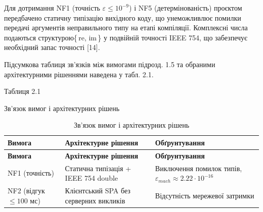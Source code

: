\documentclass[
]{article}
\begin{document}
Для дотримання NF1 (точність \(\varepsilon \leq 10^{- 9}\)) і NF5
(детермінованість) проєктом передбачено статичну типізацію вихідного
коду, що унеможливлює помилки передачі аргументів неправильного типу на
етапі компіляції. Комплексні числа подаються структурою\{ re, im \} у
подвійній точності IEEE 754, що забезпечує необхідний запас точності
{[}14{]}.

Підсумкова таблиця зв'язків між вимогами підрозд. 1.5 та обраними
архітектурними рішеннями наведена у табл. 2.1.

Таблиця 2.1

Зв'язок вимог і архітектурних рішень

\begin{longtable}[]{@{}
  >{\raggedright\arraybackslash}p{}
  >{\raggedright\arraybackslash}p{}
  >{\raggedright\arraybackslash}p{}@{}}
\caption[Зв'язок вимог і архітектурних рішень]{Зв'язок вимог і
архітектурних рішень}\tabularnewline
\toprule\noalign{}
\begin{minipage}[b]{\linewidth}\raggedright
\textbf{Вимога}
\end{minipage} & \begin{minipage}[b]{\linewidth}\raggedright
\textbf{Архітектурне рішення}
\end{minipage} & \begin{minipage}[b]{\linewidth}\raggedright
\textbf{Обґрунтування}
\end{minipage} \\
\midrule\noalign{}
\endfirsthead
\toprule\noalign{}
\begin{minipage}[b]{\linewidth}\raggedright
\textbf{Вимога}
\end{minipage} & \begin{minipage}[b]{\linewidth}\raggedright
\textbf{Архітектурне рішення}
\end{minipage} & \begin{minipage}[b]{\linewidth}\raggedright
\textbf{Обґрунтування}
\end{minipage} \\
\midrule\noalign{}
\endhead
\bottomrule\noalign{}
\endlastfoot
NF1 (точність) & Статична типізація + IEEE 754 double & Виключення
помилок типів, \(\varepsilon_{mach} \approx 2.22 \cdot 10^{- 16}\) \\
NF2 (відгук \(\leq 100\) мс) & Клієнтський SPA без серверних викликів &
Відсутність мережевої затримки \\

\end{longtable}
\end{document}
